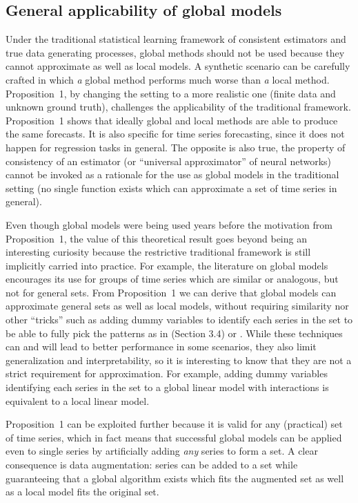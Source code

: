 \documentclass[a4paper]{article}
\theoremstyle{custom}
\begin{document}
\subsection{General applicability of global models}

Under the traditional statistical learning framework of consistent estimators and true data generating processes, global methods should not be used because they cannot approximate as well as local models.
A synthetic scenario can be carefully crafted in which \textit{a} global method performs much worse than \textit{a} local method.
Proposition~1, by changing the setting to a more realistic one (finite data and unknown ground truth), challenges the applicability of the traditional framework. Proposition~1 shows that ideally global and local methods are able to produce the same forecasts. It is also specific for time series forecasting, since it does not happen for regression tasks in general. The opposite is also true, the property of consistency of an estimator (or ``universal approximator'' of neural networks) cannot be invoked as a rationale for the use as global models in the traditional setting (no single function exists which can approximate a set of time series in general).

Even though global models were being used years before the motivation from Proposition~1, the value of this theoretical result goes beyond being an interesting curiosity because the restrictive traditional framework is still implicitly carried into practice. For example, the literature on global models encourages its use for groups of time series which are similar or analogous, but not for general sets. From Proposition~1 we can derive that global models can approximate general sets as well as local models, without requiring similarity nor other ``tricks'' such as adding dummy variables to identify each series in the set to be able to fully pick the patterns as in \cite{salinas2019DeepAR} (Section 3.4) or \cite{oord2016wavenet}. While these techniques can and will lead to better performance in some scenarios, they also limit generalization and interpretability, so it is interesting to know that they are not a strict requirement for approximation. For example, adding dummy variables identifying each series in the set to a global linear model with interactions is equivalent to a local linear model.

Proposition~1 can be exploited further because it is valid for any (practical) set of time series, which in fact means that successful global models can be applied even to single series by artificially adding \textit{any} series to form a set. A clear consequence is data augmentation: series can be added to a set while guaranteeing that a global algorithm exists which fits the augmented set as well as a local model fits the original set.
\end{document}
